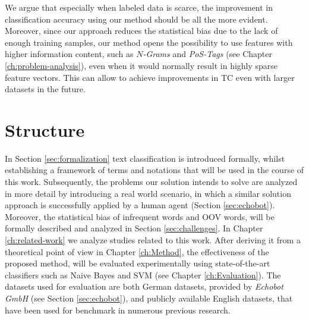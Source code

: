 We argue that especially when labeled data is scarce, the
improvement in classification accuracy using our method should be all the more evident. Moreover, since our
approach reduces the statistical bias due to the lack of enough training
samples, our method opens the possibility to use features with higher information content, such as \emph{$N$-Grams} 
and \emph{PoS-Tags} (see Chapter \ref{ch:problem-analysis}), even when it would normally result in 
highly sparse feature vectors. This can allow to achieve improvements in TC
even with larger datasets in the future.

\section{Structure}
In Section \ref{sec:formalization} text classification is introduced formally,
whilst establishing a framework of terms and notations that will be used in the course of this work. 
Subsequently, the problems our solution intends to solve are analyzed in more
detail by introducing a real world scenario, in which a similar solution approach is successfully applied by a human agent (Section \ref{sec:echobot}).
Moreover, the statistical bias of infrequent words and OOV words, will be
formally described and analyzed in Section \ref{sec:challenges}. 
In Chapter \ref{ch:related-work} we analyze studies related to this work.
After deriving it from a  theoretical point of view in Chapter \ref{ch:Method}, the effectiveness
of the proposed method, will be evaluated experimentally using state-of-the-art classifiers 
such as Naive Bayes and SVM (see Chapter \ref{ch:Evaluation}). The datasets used
for evaluation are both German datasets, provided by \emph{Echobot GmbH} (see Section \ref{sec:echobot}), 
and publicly available English datasets, that have been used for benchmark in numerous previous research. 

 